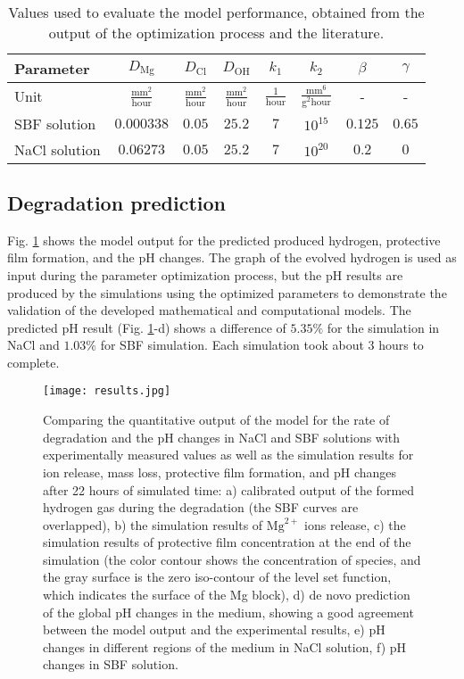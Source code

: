 \begin{table}[t]
\caption[Values used in the biodegradation model simulation performance]{Values used to evaluate the model performance, obtained from the output of the optimization process and the literature.}
\medskip
\centering
\begin{tabular}{lccccccc}
Parameter & $D_\mathrm{Mg}$ & $D_\mathrm{Cl}$ & $D_\mathrm{OH}$ & $k_1$ & $k_2$ & $\beta$ & $\gamma$ \\ \hline
Unit      & $\frac{\mathrm{mm}^2}{\mathrm{hour}}$ & $\frac{\mathrm{mm}^2}{\mathrm{hour}}$ & $\frac{\mathrm{mm}^2}{\mathrm{hour}}$ & $\frac{1}{\mathrm{hour}}$ & $\frac{\mathrm{mm}^6}{\mathrm{g}^2 \mathrm{hour}}$ & - & - \\ \hline
\gls{SBF} solution       & $0.000338$ & $0.05$ & $25.2$ & $7$ & $10^{15}$ & $0.125$ & $0.65$  \\
NaCl solution      & $0.06273$ & $0.05$ & $25.2$ & $7$ & $10^{20}$ & $0.2$ & $0$
\end{tabular}
\label{tab:parameters}
\end{table}

\subsection{Degradation prediction}

Fig. \ref{fig:results} shows the model output for the predicted produced hydrogen, protective film formation, and the pH changes. The graph of the evolved hydrogen is used as input during the parameter optimization process, but the pH results are produced by the simulations using the optimized parameters to demonstrate the validation of the developed mathematical and computational models. The predicted pH result (Fig. \ref{fig:results}-d) shows a difference of $5.35 \%$ for the simulation in NaCl and $1.03 \%$ for \gls{SBF} simulation. Each simulation took about 3 hours to complete.

\begin{figure}[t]
\centering
\medskip
\texttt{[image: results.jpg]}
\caption[Simulation results of the cuboid sample in the biodegradation test]{Comparing the quantitative output of the model for the rate of degradation and the pH changes in NaCl and \gls{SBF} solutions with experimentally measured values as well as the simulation results for ion release, mass loss, protective film formation, and pH changes after 22 hours of simulated time: a) calibrated output of the formed hydrogen gas during the degradation (the \gls{SBF} curves are overlapped), b) the simulation results of $\mathrm{Mg}^{2+}$ ions release, c) the simulation results of protective film concentration at the end of the simulation (the color contour shows the concentration of species, and the gray surface is the zero iso-contour of the level set function, which indicates the surface of the Mg block), d) de novo prediction of the global pH changes in the medium, showing a good agreement between the model output and the experimental results, e) pH changes in different regions of the medium in NaCl solution, f) pH changes in \gls{SBF} solution.} \label{fig:results}
\end{figure}

